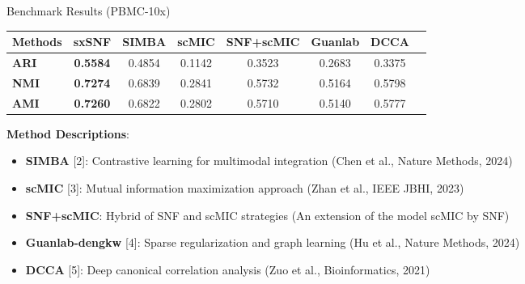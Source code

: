 \documentclass{beamer}
\begin{document}
\begin{frame}{Benchmark Results (PBMC-10x)}

\vspace{-1ex}
\begin{table}[h]
\centering
\scriptsize
\begin{tabular}{|l|c|c|c|c|c|c|c|}
\hline
\rule{0pt}{3ex}\textbf{Methods} & \textbf{sxSNF} & \textbf{SIMBA} & \textbf{scMIC} & \textbf{SNF+scMIC} & \textbf{Guanlab} & \textbf{DCCA}\rule[-1.5ex]{0pt}{0pt} \\
\hline
\rule{0pt}{3ex}\textbf{ARI} & \textcolor{sintefyellow}{\textbf{0.5584}} & 0.4854 & 0.1142 & 0.3523 & 0.2683 & 0.3375\rule[-1.5ex]{0pt}{0pt} \\
\hline
\rule{0pt}{3ex}\textbf{NMI} & \textcolor{sintefyellow}{\textbf{0.7274}} & 0.6839 & 0.2841 & 0.5732 & 0.5164 & 0.5798\rule[-1.5ex]{0pt}{0pt} \\
\hline
\rule{0pt}{3ex}\textbf{AMI} & \textcolor{sintefyellow}{\textbf{0.7260}} & 0.6822 & 0.2802 & 0.5710 & 0.5140 & 0.5777\rule[-1.5ex]{0pt}{0pt} \\
\hline
\end{tabular}
\end{table}

\vspace{0.1cm}

\scriptsize
\textbf{Method Descriptions}:
\begin{itemize}
    \item \scriptsize \textbf{SIMBA} [2]: Contrastive learning for multimodal integration (Chen et al., Nature Methods, 2024)
    \item \scriptsize \textbf{scMIC} [3]: Mutual information maximization approach (Zhan et al., IEEE JBHI, 2023)
    \item \scriptsize \textbf{SNF+scMIC}: Hybrid of SNF and scMIC strategies (An extension of the model scMIC by SNF)
    \item \scriptsize \textbf{Guanlab-dengkw} [4]: Sparse regularization and graph learning (Hu et al., Nature Methods, 2024)
    \item \scriptsize \textbf{DCCA} [5]: Deep canonical correlation analysis (Zuo et al., Bioinformatics, 2021)
\end{itemize}

\end{frame}
  
\end{document}
